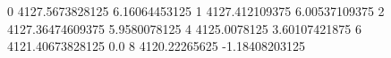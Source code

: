 0 4127.5673828125 6.16064453125
1 4127.412109375 6.00537109375
2 4127.36474609375 5.9580078125
4 4125.0078125 3.60107421875
6 4121.40673828125 0.0
8 4120.22265625 -1.18408203125
